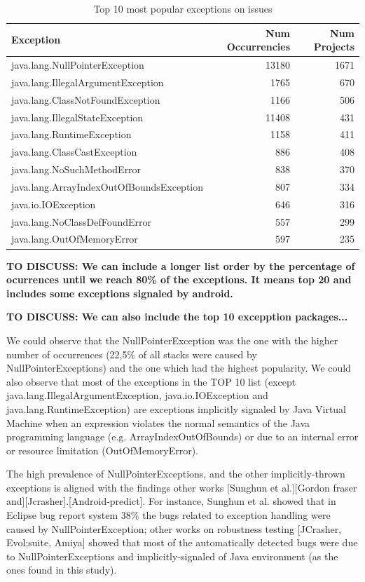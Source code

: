 \documentclass[conference]{IEEEtran}
\begin{document}
\begin{table}
\begin{tabular}{lrr}
    \hline
    \bfseries{Exception} & \bfseries{Num Occurrencies} & \bfseries{Num Projects} \\
    \hline
      java.lang.NullPointerException &	13180 &	1671 \\
      java.lang.IllegalArgumentException &	1765 &	670 \\
      java.lang.ClassNotFoundException &	1166 &	506 \\
      java.lang.IllegalStateException &	11408 &	431 \\
      java.lang.RuntimeException &	1158 &	411 \\
      java.lang.ClassCastException &	886 &	408 \\
      java.lang.NoSuchMethodError &	838 &	370 \\
      java.lang.ArrayIndexOutOfBoundsException &	807 &	334 \\
      java.io.IOException &	646 &	316 \\
      java.lang.NoClassDefFoundError &	557 &	299  \\
      java.lang.OutOfMemoryError &	597 &	235 \\
    \hline
  \end{tabular}
\caption{Top 10 most popular exceptions on issues}
\label{tab:toptenpopular}
\end{table}

\textbf{TO DISCUSS: We can include a longer list order by the percentage of ocurrences until we reach 80\% of the 
exceptions. It means top 20 and includes some exceptions signaled by android.}

\textbf{TO DISCUSS: We can also include the top 10 excepption packages...}

We could observe that the NullPointerException was the one with the higher number of occurrences (22,5\% of all stacks were caused by NullPointerExceptions) and the one which had the highest popularity. We could also observe that most of the exceptions in the TOP 10 list (except java.lang.IllegalArgumentException, java.io.IOException and java.lang.RuntimeException) are exceptions implicitly signaled by Java Virtual Machine when an expression violates the normal semantics of the Java programming language (e.g. ArrayIndexOutOfBounds) or due to an internal error or resource limitation (OutOfMemoryError). 

The high prevalence of NullPointerExceptions, and the other implicitly-thrown exceptions  is aligned with the findings other works [Sunghun et al.][Gordon fraser and][Jcrasher].[Android-predict]. For instance, Sunghun et al. showed that in Eclipse bug report system 38\% the bugs related to exception handling were caused by NullPointerException; other works on robustness testing [JCrasher, Evol;suite, Amiya] showed that most of the automatically detected bugs were due to NullPointerExceptions and implicitly-signaled of Java environment (as the ones found in this study).
\end{document}
